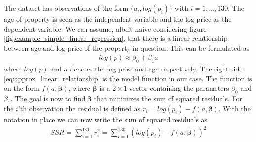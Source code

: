 The dataset has observations of the form $\{a_i, log(p_i)\}$ with $i = 1, \ldots, 130$. The age of property is seen as the independent variable and the log price as the dependent variable.
We can assume, albeit naive considering figure \ref{fig:example_simple_linear_regression}, that there is a linear relationship between age and log price of the property in question.
This can be formulated as
\begin{align}\label{eq:approx_linear_relationship}
    log(p) \approx \beta_0 + \beta_1 a
\end{align}
where $log(p)$ and $a$ denotes the log price and age respectively.
The right side \eqref{eq:approx_linear_relationship} is the model function in our case.
The function is on the form $f(a, \boldsymbol{\beta})$, where $\boldsymbol{\beta}$ is a $2 \times 1$ vector containing the parameters $\beta_0$ and $\beta_1$.
The goal is now to find $\boldsymbol{\beta}$ that minimizes the sum of squared residuals.
For the $i$'th observation the residual is defined as $r_i = log(p_i) - f(a, \boldsymbol{\beta})$.
With the notation in place we can now write the sum of squared residuals as
\begin{align}\label{eq:SSR}
  SSR = \sum_{i = 1}^{130} r_i^2 = \sum_{i = 1}^{130} \left( log(p_i) - f(a, \boldsymbol{\beta}) \right)^2
\end{align}


